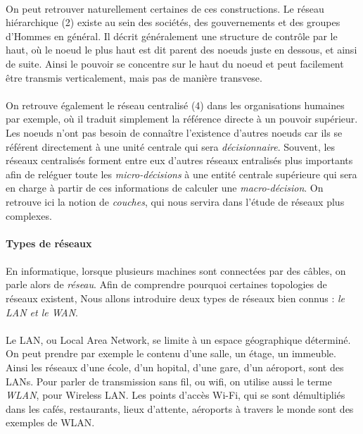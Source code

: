 \paragraph{} On peut retrouver naturellement certaines de ces constructions. Le réseau hiérarchique (2) existe
au sein des sociétés, des gouvernements et des groupes d'Hommes en général. Il décrit généralement une structure
de contrôle par le haut, où le noeud le plus haut est dit parent des noeuds juste en dessous, et ainsi de suite.
Ainsi le pouvoir se concentre sur le haut du noeud et peut facilement être transmis verticalement, mais pas de 
manière transvese.

\paragraph{} On retrouve également le réseau centralisé (4) dans les organisations humaines par exemple,
où il traduit simplement la référence directe à un pouvoir supérieur. Les noeuds n'ont pas besoin de connaître
l'existence d'autres noeuds car ils se référent directement à une unité centrale qui sera \emph{décisionnaire}.
Souvent, les réseaux centralisés forment entre eux d'autres réseaux entralisés plus importants afin de reléguer
toute les \emph{micro-décisions} à une entité centrale supérieure qui sera en charge à partir de ces informations
de calculer une \emph{macro-décision}. On retrouve ici la notion de \emph{couches}, qui nous servira dans l'étude
de réseaux plus complexes.

\paragraph{Types de réseaux}

\paragraph{} En informatique, lorsque plusieurs machines sont connectées par des câbles, on
parle alors de \emph{réseau}. Afin de comprendre pourquoi certaines topologies de réseaux 
existent, Nous allons introduire deux types de réseaux bien connus : \emph{le LAN et le WAN}.

\paragraph{} Le LAN, ou Local Area Network, se limite à un espace géographique déterminé. On peut prendre
par exemple le contenu d'une salle, un étage, un immeuble. Ainsi les réseaux d'une école, d'un
hopital, d'une gare, d'un aéroport, sont des LANs. Pour parler de transmission sans fil, ou
wifi, on utilise aussi le terme \emph{WLAN}, pour Wireless LAN. Les points d'accès Wi-Fi, qui se
sont démultipliés dans les cafés, restaurants, lieux d'attente, aéroports à travers le monde
sont des exemples de WLAN.


